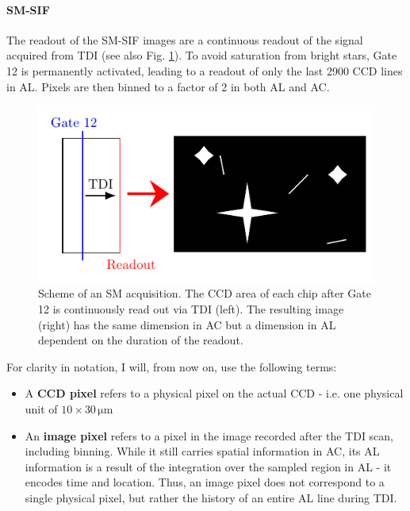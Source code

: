 \documentclass[a4paper, 11pt]{article}
\begin{document}
\paragraph{SM-SIF \\}

The readout of the SM-SIF images are a continuous readout of the signal acquired from TDI (see also Fig. \ref{fig:SM_Acq}). To avoid saturation from bright stars, Gate 12 is permanently activated, leading to a readout of only the last 2900 CCD lines in AL. Pixels are then binned to a factor of 2 in both AL and AC.

\begin{figure}[h]
  \centering
  \includegraphics{images/postprocessing/acquisition_SM}
  \caption{Scheme of an SM acquisition. The CCD area of each chip after Gate 12 is continuously read out via TDI (left). The resulting image (right) has the same dimension in AC but a dimension in AL dependent on the duration of the readout.}
  \label{fig:SM_Acq}
\end{figure}


For clarity in notation, I will, from now on, use the following terms:
\begin{itemize}
  \item A \textbf{CCD pixel} refers to a physical pixel on the actual CCD - i.e. one physical unit of $10 \times 30\, \mathrm{\mu m}$
  \item An \textbf{image pixel} refers to a pixel in the image recorded after the TDI scan, including binning. While it still carries spatial information in AC, its AL information is a result of the integration over the sampled region in AL - it encodes time and location. Thus, an image pixel does not correspond to a single physical pixel, but rather the history of an entire AL line during TDI.
\end{itemize}
\end{document}
